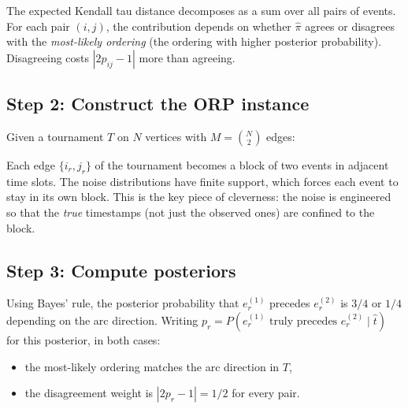 \documentclass[11pt]{article}
\begin{document}
The expected Kendall tau distance decomposes as a sum over all pairs of events. For each pair $(i, j)$, the contribution depends on whether $\hat{\pi}$ agrees or disagrees with the \emph{most-likely ordering} (the ordering with higher posterior probability). Disagreeing costs $|2p_{ij} - 1|$ more than agreeing.

\subsection*{Step 2: Construct the ORP instance}

Given a tournament $T$ on $N$ vertices with $M = \binom{N}{2}$ edges:

\begin{center}
\end{center}

Each edge $\{i_r, j_r\}$ of the tournament becomes a block of two events in adjacent time slots. The noise distributions have finite support, which forces each event to stay in its own block. This is the key piece of cleverness: the noise is engineered so that the \emph{true} timestamps (not just the observed ones) are confined to the block.

\subsection*{Step 3: Compute posteriors}

Using Bayes' rule, the posterior probability that $e_r^{(1)}$ precedes $e_r^{(2)}$ is $3/4$ or $1/4$ depending on the arc direction. Writing $p_r = P(e_r^{(1)} \text{ truly precedes } e_r^{(2)} \mid \hat{t})$ for this posterior, in both cases:
\begin{itemize}
\item the most-likely ordering matches the arc direction in $T$,
\item the disagreement weight is $|2p_r - 1| = 1/2$ for every pair.
\end{itemize}
\end{document}

